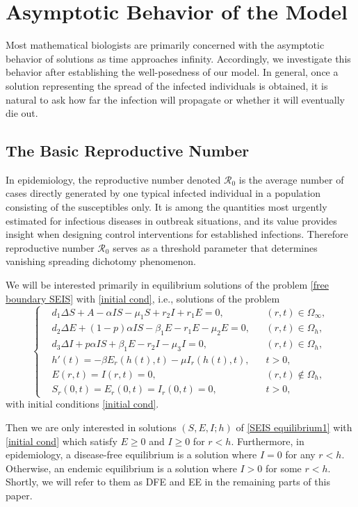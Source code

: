 \documentclass[11pt]{amsart}
\numberwithin{equation}{section}
\theoremstyle{plain}
\theoremstyle{definition}
\begin{document}
\section{Asymptotic Behavior of the Model}
Most mathematical biologists are primarily concerned with the asymptotic behavior of solutions as time approaches infinity. Accordingly, we investigate this behavior after establishing the well-posedness of our model. In general, once a solution representing the spread of the infected individuals  is obtained, it is natural to ask how far the infection will propagate or whether it will eventually die out.

\subsection{The Basic Reproductive Number}
In epidemiology, the reproductive number denoted $\mathcal R_0$ is the average number of cases directly generated by one typical infected individual in a population consisting of the susceptibles only. It is among the quantities most urgently estimated for infectious diseases in outbreak situations, and its value provides insight when designing control interventions for established infections. Therefore reproductive number $\mathcal R_0$ serves as a threshold parameter that determines vanishing spreading dichotomy phenomenon.

We will be interested primarily in equilibrium solutions of the problem \cref{free boundary SEIS} with \cref{initial cond}, i.e., solutions of the problem
\begin{equation} \label{SEIS equilibrium1}
		\left \{ \begin{aligned}	
		&d_1\Delta S+A-\alpha IS-\mu_1 S+r_2 I+r_1E=0,&&(r,t)\in\Omega_\infty,\\
		&d_2\Delta E+(1-p)\alpha IS-\beta_1 E-r_1E-\mu_2 E=0,&&(r,t)\in \Omega_h,\\
		&d_3\Delta I+p\alpha IS+\beta_1 E-r_2I-\mu_3 I=0, &&(r,t)\in \Omega_h,\\
		&h'(t)=-\beta E_r(h(t),t)-\mu I_r(h(t),t),&&t>0,\\
		&E(r,t)=I(r,t)=0, &&(r,t)\notin \Omega_h,\\
		&S_r(0,t)=E_r(0,t)=I_r(0,t)=0, &&t>0,
		\end{aligned} \right.
\end{equation}
with initial conditions \cref{initial cond}.

Then we are only interested in solutions $(S,E,I;h)$ of \cref{SEIS equilibrium1} with \cref{initial cond} which satisfy $E \geq 0$ and $I \geq 0$ for $r<h$. Furthermore, in epidemiology, a disease-free equilibrium is a solution where $I=0$ for any $r<h$. Otherwise, an endemic equilibrium is a solution where $I>0$ for some $r<h$. Shortly, we will refer to them as DFE and EE in the remaining parts of this paper.
\end{document}
